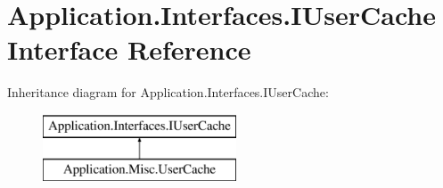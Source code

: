 \hypertarget{interface_application_1_1_interfaces_1_1_i_user_cache}{}\section{Application.\+Interfaces.\+I\+User\+Cache Interface Reference}
\label{interface_application_1_1_interfaces_1_1_i_user_cache}
Inheritance diagram for Application.\+Interfaces.\+I\+User\+Cache\+:\begin{figure}[H]
\begin{center}
\leavevmode
\includegraphics[height=2.000000cm]{interface_application_1_1_interfaces_1_1_i_user_cache}
\end{center}
\end{figure}
